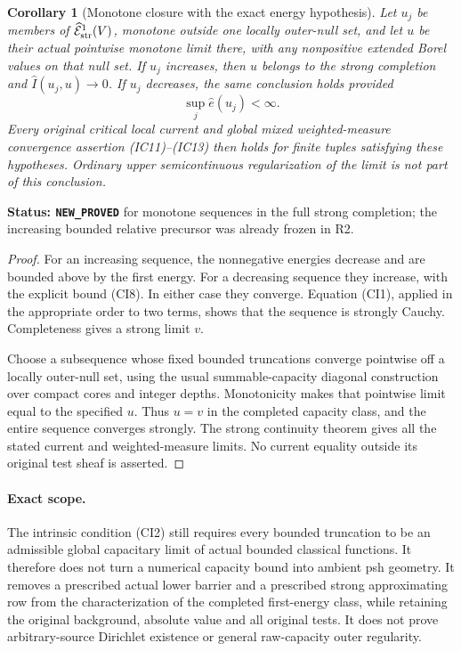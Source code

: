 \documentclass[11pt,a4paper]{article}
\numberwithin{equation}{section}
\newtheorem{corollary}[theorem]{Corollary}
\theoremstyle{definition}
\theoremstyle{remark}
\begin{document}
\begin{corollary}[Monotone closure with the exact energy hypothesis]
\label{cor:r11-strong-monotone-closure}
Let $u_j$ be members of
$\widehat{\mathcal E}^1_{\rm str}(V)$, monotone outside one
locally outer-null set, and let $u$ be their actual pointwise
monotone limit there, with any nonpositive extended Borel values
on that null set.
If $u_j$ increases, then $u$ belongs to the strong completion
and $\widehat I(u_j,u)\to0$.
If $u_j$ decreases, the same conclusion holds provided
\[
                            \sup_j\widehat e(u_j)<\infty.
 \tag{CI8}
\]
Every original critical local current and global mixed
weighted-measure convergence assertion (IC11)--(IC13)
then holds for finite tuples satisfying these hypotheses.
Ordinary upper semicontinuous regularization of the limit
is not part of this conclusion.
\end{corollary}

\noindent\textbf{Status: \texttt{NEW\_PROVED}} for monotone
sequences in the full strong completion; the increasing
bounded relative precursor was already frozen in R2.

\begin{proof}
For an increasing sequence, the nonnegative energies decrease
and are bounded above by the first energy. For a decreasing
sequence they increase, with the explicit bound (CI8).
In either case they converge. Equation (CI1), applied in
the appropriate order to two terms, shows that the sequence
is strongly Cauchy. Completeness gives a strong limit $v$.

Choose a subsequence whose fixed bounded truncations converge
pointwise off a locally outer-null set, using the usual
summable-capacity diagonal construction over compact cores
and integer depths. Monotonicity makes that pointwise limit
equal to the specified $u$. Thus $u=v$ in the completed
capacity class, and the entire sequence converges strongly.
The strong continuity theorem gives all the stated current
and weighted-measure limits. No current equality outside its
original test sheaf is asserted.
\end{proof}

\paragraph{Exact scope.}
The intrinsic condition (CI2) still requires every bounded
truncation to be an admissible global capacitary limit of
actual bounded classical functions. It therefore does not
turn a numerical capacity bound into ambient psh geometry.
It removes a prescribed actual lower barrier and a prescribed
strong approximating row from the characterization of the
completed first-energy class, while retaining the original
background, absolute value and all original tests. It does
not prove arbitrary-source Dirichlet existence or general
raw-capacity outer regularity.
\end{document}
